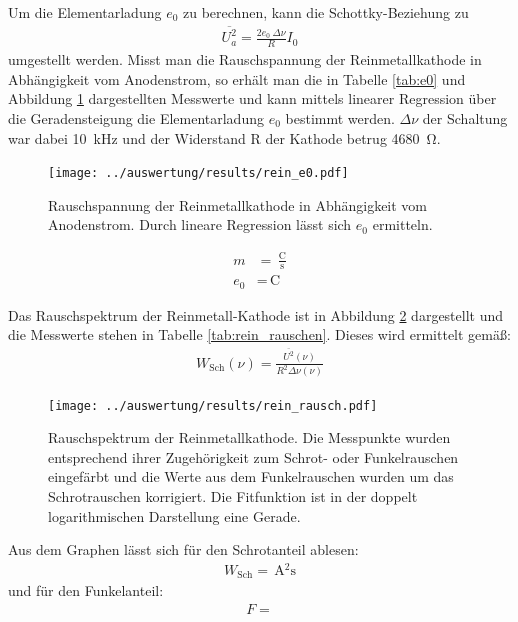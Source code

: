 Um die Elementarladung $e_0$ zu berechnen, kann die Schottky-Beziehung zu
\begin{align}
	\overline{U_a^2} = \frac{2e_0 \ \Delta\nu}{R} I_0
\end{align}
umgestellt werden. Misst man die Rauschspannung der Reinmetallkathode in Abhängigkeit vom Anodenstrom, so erhält man die in Tabelle \ref{tab:e0} und Abbildung \ref{fig:e0} dargestellten Messwerte und kann mittels linearer Regression über die Geradensteigung die Elementarladung $e_0$ bestimmt werden. $\Delta\nu$ der Schaltung war dabei \SI{10}{\kilo\hertz} und der Widerstand R der Kathode betrug \SI{4680}{\ohm}.
\begin{figure}[h]
	\texttt{[image: ../auswertung/results/rein\_e0.pdf]}
	\caption{Rauschspannung der Reinmetallkathode in Abhängigkeit vom Anodenstrom. Durch lineare Regression lässt sich $e_0$ ermitteln.}
	\label{fig:e0}
\end{figure}
\begin{align}
	m &= \, \frac{\si{\coulomb}}{\si{\second}}\\
	e_0 &= \, \si{\coulomb}
\end{align}

Das Rauschspektrum der Reinmetall-Kathode ist in Abbildung \ref{fig:rauschspektrum} dargestellt und die Messwerte stehen in Tabelle \ref{tab:rein_rauschen}. Dieses wird ermittelt gemäß:
\begin{align}
	W_\text{Sch}(\nu) = \frac{\overline{U^2}(\nu)}{R^2 \Delta\nu(\nu)} 
\end{align}
\begin{figure}[h]
	\texttt{[image: ../auswertung/results/rein\_rausch.pdf]}
	\caption{Rauschspektrum der Reinmetallkathode. Die Messpunkte wurden entsprechend ihrer Zugehörigkeit zum Schrot- oder Funkelrauschen eingefärbt und die Werte aus dem Funkelrauschen wurden um das Schrotrauschen korrigiert. Die Fitfunktion ist in der doppelt logarithmischen Darstellung eine Gerade.}
	\label{fig:rauschspektrum}
\end{figure}
Aus dem Graphen lässt sich für den Schrotanteil ablesen:
\begin{align}
	W_\text{Sch} = \,\si{\ampere^2\second}
\end{align}
und für den Funkelanteil:
\begin{align}
F = 
\end{align}

